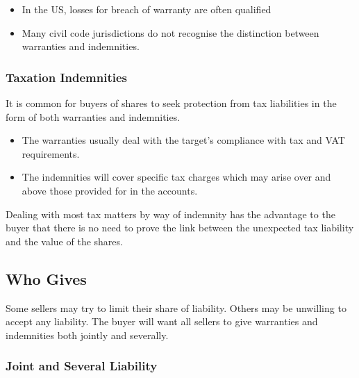 \documentclass[
]{article}
\newenvironment{Shaded}{}{}
\newcommand{\NormalTok}[1]{#1}
\providecommand{\tightlist}{%
  \setlength{\itemsep}{0pt}\setlength{\parskip}{0pt}}
\begin{document}
\begin{itemize}
\tightlist
\item
  In the US, losses for breach of warranty are often qualified
\item
  Many civil code jurisdictions do not recognise the distinction between
  warranties and indemnities.
\end{itemize}

\hypertarget{taxation-indemnities}{%
\subsubsection{Taxation Indemnities}\label{taxation-indemnities}}

It is common for buyers of shares to seek protection from tax
liabilities in the form of both warranties and indemnities.

\begin{itemize}
\tightlist
\item
  The warranties usually deal with the target's compliance with tax and
  VAT requirements.
\item
  The indemnities will cover specific tax charges which may arise over
  and above those provided for in the accounts.
\end{itemize}

\begin{Shaded}
\begin{Highlighting}[]
\NormalTok{Dealing with most tax matters by way of indemnity has the advantage to the buyer that there is no need to prove the link between the unexpected tax liability and the value of the shares.}
\end{Highlighting}
\end{Shaded}

\hypertarget{who-gives}{%
\subsection{Who Gives}\label{who-gives}}

Some sellers may try to limit their share of liability. Others may be
unwilling to accept any liability. The buyer will want all sellers to
give warranties and indemnities both jointly and severally.

\hypertarget{joint-and-several-liability}{%
\subsubsection{Joint and Several
Liability}\label{joint-and-several-liability}}
\end{document}
